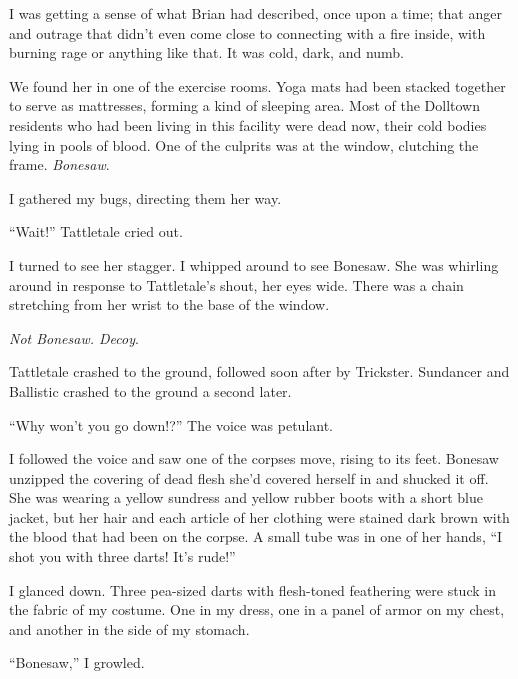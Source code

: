 I was getting a sense of what Brian had described, once upon a time; that anger and outrage that didn't even come close to connecting with a fire inside, with burning rage or anything like that.  It was cold, dark, and numb.



We found her in one of the exercise rooms.  Yoga mats had been stacked together to serve as mattresses, forming a kind of sleeping area.  Most of the Dolltown residents who had been living in this facility were dead now, their cold bodies lying in pools of blood.  One of the culprits was at the window, clutching the frame. \emph{ Bonesaw}.



I gathered my bugs, directing them her way.



``Wait!''  Tattletale cried out.



I turned to see her stagger.  I whipped around to see Bonesaw.  She was whirling around in response to Tattletale's shout, her eyes wide.  There was a chain stretching from her wrist to the base of the window.



\emph{Not Bonesaw.  Decoy}.



Tattletale crashed to the ground, followed soon after by Trickster.  Sundancer and Ballistic crashed to the ground a second later.



``Why won't you go down!?''  The voice was petulant.



I followed the voice and saw one of the corpses move, rising to its feet.  Bonesaw unzipped the covering of dead flesh she'd covered herself in and shucked it off.  She was wearing a yellow sundress and yellow rubber boots with a short blue jacket, but her hair and each article of her clothing were stained dark brown with the blood that had been on the corpse.  A small tube was in one of her hands, ``I shot you with three darts!  It's rude!''



I glanced down.  Three pea-sized darts with flesh-toned feathering were stuck in the fabric of my costume.  One in my dress, one in a panel of armor on my chest, and another in the side of my stomach.



``Bonesaw,'' I growled.



